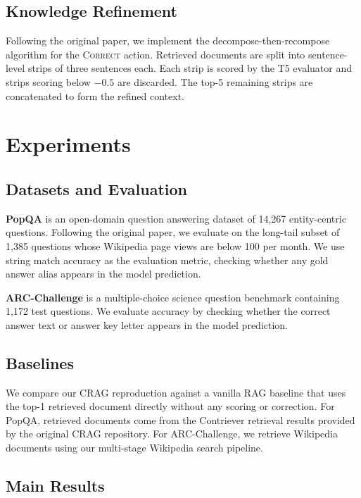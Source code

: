 \documentclass[11pt]{article}
\begin{document}
\subsection{Knowledge Refinement}
Following the original paper, we implement the decompose-then-recompose algorithm for the
\textsc{Correct} action. Retrieved documents are split into sentence-level strips of three
sentences each. Each strip is scored by the T5 evaluator and strips scoring below $-0.5$ are
discarded. The top-5 remaining strips are concatenated to form the refined context.

\clearpage
\section{Experiments}

\subsection{Datasets and Evaluation}

\textbf{PopQA} \cite{mallen2023trust} is an open-domain question answering dataset of 14,267
entity-centric questions. Following the original paper, we evaluate on the long-tail subset of
1,385 questions whose Wikipedia page views are below 100 per month. We use string match accuracy
as the evaluation metric, checking whether any gold answer alias appears in the model prediction.

\textbf{ARC-Challenge} \cite{bhakthavatsalam2021think} is a multiple-choice science question
benchmark containing 1,172 test questions. We evaluate accuracy by checking whether the correct
answer text or answer key letter appears in the model prediction.

\subsection{Baselines}

We compare our CRAG reproduction against a vanilla RAG baseline that uses the top-1 retrieved
document directly without any scoring or correction. For PopQA, retrieved documents come from the
Contriever retrieval results provided by the original CRAG repository. For ARC-Challenge, we
retrieve Wikipedia documents using our multi-stage Wikipedia search pipeline.

\subsection{Main Results}
\end{document}
